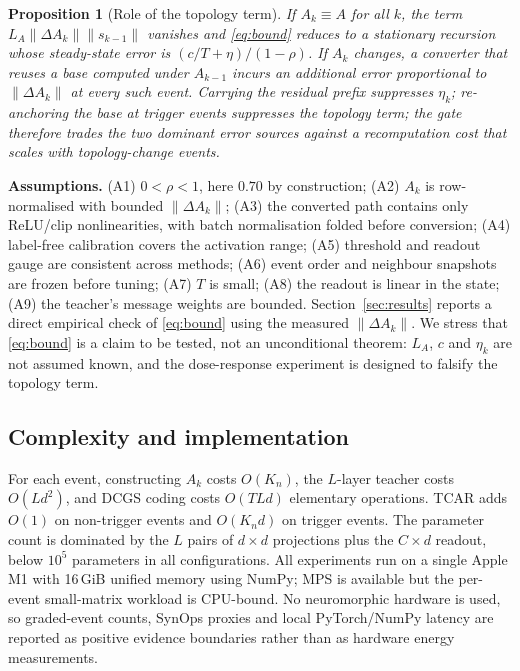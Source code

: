 \documentclass[preprint,12pt]{elsarticle}
\newtheorem{proposition}{Proposition}
\begin{document}
\begin{proposition}[Role of the topology term]
If $A_k\equiv A$ for all $k$, the term $L_A\|\Delta A_k\|\|s_{k-1}\|$ vanishes and \eqref{eq:bound} reduces to a stationary recursion whose steady-state error is $(c/T+\eta)/(1-\rho)$. If $A_k$ changes, a converter that reuses a base computed under $A_{k-1}$ incurs an additional error proportional to $\|\Delta A_k\|$ at every such event. Carrying the residual prefix suppresses $\eta_k$; re-anchoring the base at trigger events suppresses the topology term; the gate therefore trades the two dominant error sources against a recomputation cost that scales with topology-change events.
\end{proposition}

\textbf{Assumptions.} (A1) $0<\rho<1$, here $0.70$ by construction; (A2) $A_k$ is row-normalised with bounded $\|\Delta A_k\|$; (A3) the converted path contains only ReLU/clip nonlinearities, with batch normalisation folded before conversion; (A4) label-free calibration covers the activation range; (A5) threshold and readout gauge are consistent across methods; (A6) event order and neighbour snapshots are frozen before tuning; (A7) $T$ is small; (A8) the readout is linear in the state; (A9) the teacher's message weights are bounded. Section~\ref{sec:results} reports a direct empirical check of \eqref{eq:bound} using the measured $\|\Delta A_k\|$. We stress that \eqref{eq:bound} is a claim to be tested, not an unconditional theorem: $L_A$, $c$ and $\eta_k$ are not assumed known, and the dose-response experiment is designed to falsify the topology term.

\subsection{Complexity and implementation}

For each event, constructing $A_k$ costs $O(K_n)$, the $L$-layer teacher costs $O(Ld^2)$, and DCGS coding costs $O(TLd)$ elementary operations. TCAR adds $O(1)$ on non-trigger events and $O(K_n d)$ on trigger events. The parameter count is dominated by the $L$ pairs of $d\times d$ projections plus the $C\times d$ readout, below $10^5$ parameters in all configurations. All experiments run on a single Apple M1 with 16\,GiB unified memory using NumPy; MPS is available but the per-event small-matrix workload is CPU-bound. No neuromorphic hardware is used, so graded-event counts, SynOps proxies and local PyTorch/NumPy latency are reported as positive evidence boundaries rather than as hardware energy measurements.
\end{document}
